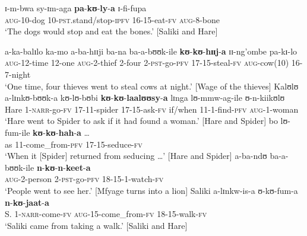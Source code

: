 \begin{exe}
\ex \label{exLocInfMovementVerb16} \gll ɪ-m-bwa sy-ɪm-aga \textbf{pa}-\textbf{kʊ}-\textbf{ly}-\textbf{a} ɪ-fi-fupa\\
\textsc{aug}-10-dog 10-\textsc{pst}.stand/stop-\textsc{ipfv} 16-15-eat-\textsc{fv} \textsc{aug}-8-bone\\
\glt \lq The dogs would stop and eat the bones.' [Saliki and Hare]

\ex \label{exLocInfMovementVerb17purpose}
\gll a-ka-balɪlo ka-mo a-ba-hɪɪji ba-na ba-a-bʊʊk-ile \textbf{kʊ}-\textbf{kʊ}-\textbf{hɪɪj}-\textbf{a} ɪɪ-ng'ombe pa-kɪ-lo\\
\textsc{aug}-12-time 12-one \textsc{aug}-2-thief 2-four 2-\textsc{pst}-go-\textsc{pfv} 17-15-steal-\textsc{fv} \textsc{aug}-cow(10) 16-7-night\\
\glt \lq One time, four thieves went to steal cows at night.' [Wage of the thieves]
\ex \label{exLocInfMovementVerb17both}
\gll Kalʊlʊ a-lɪnkʊ-bʊʊk-a kʊ-lʊ-bʊbi \textbf{kʊ}-\textbf{kʊ}-\textbf{laalʊʊsy}-\textbf{a} lɪnga lʊ-mmw-ag-ile ʊ-n-kiikʊlʊ\\
Hare 1-\textsc{narr}-go-\textsc{fv} 17-11-spider 17-15-ask-\textsc{fv} if/when 11-1-find-\textsc{pfv} \textsc{aug}-1-woman\\
\glt \lq Hare went to Spider to ask if it had found a woman.' [Hare and Spider]
\ex \label{exLocInfMovementVerb17locational}
\gll bo lʊ-fum-ile \textbf{kʊ}-\textbf{kʊ}-\textbf{hah}-\textbf{a} \ldots\\
as 11-come\_from-\textsc{pfv} 17-15-seduce-\textsc{fv} {}\\
\glt \lq When it [Spider] returned from seducing \ldots' [Hare and Spider]
\ex \label{exLocInfMovementVerb18purpose}
\gll a-ba-ndʊ ba-a-bʊʊk-ile \textbf{n}-\textbf{kʊ}-\textbf{n}-\textbf{keet}-\textbf{a}\\
\textsc{aug}-2-person 2-\textsc{pst}-go-\textsc{pfv} 18-15-1-watch-\textsc{fv}\\
\glt \lq People went to see her.' [Mfyage turns into a lion]
\ex \label{exLocInfMovementVerb18locational}
\gll Saliki a-lɪnkw-is-a ʊ-kʊ-fum-a \textbf{n}-\textbf{kʊ}-\textbf{jaat}-\textbf{a}\\
S. 1-\textsc{narr}-come-\textsc{fv} \textsc{aug}-15-come\_from-\textsc{fv} 18-15-walk-\textsc{fv}\\
\glt \lq Saliki came from taking a walk.' [Saliki and Hare]
\end{exe}

